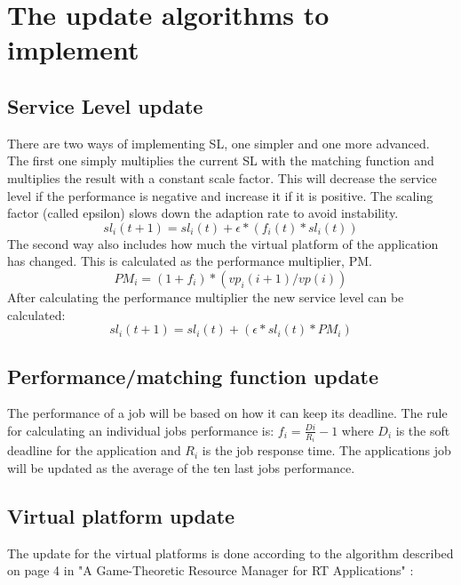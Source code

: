 \documentclass[nobiblatex]{LTHthesis}
\begin{document}
\section{The update algorithms to implement}


\subsection{Service Level update}
There are two ways of implementing SL, one simpler and one more advanced. The first one simply multiplies the current SL with the matching function and multiplies the result with a constant scale factor. This will decrease the service level if the performance is negative and increase it if it is positive. The scaling factor (called epsilon) slows down the adaption rate to avoid instability. 
\[sl_i(t+1)= sl_i(t) + \epsilon*(f_i(t)*sl_i(t)) \]
The second way also includes how much the virtual platform of the application has changed. This is calculated as the performance multiplier, PM.
\[PM_i = (1+f_i)*(vp_i(i+1)/vp(i))\]
After calculating the performance multiplier the new service level can be calculated:
\[sl_i(t+1)=sl_i(t) + (\epsilon*sl_i(t)*PM_i)\]

\subsection{Performance/matching function update}
The performance of a job will be based on how it can keep its deadline. The rule for calculating an individual jobs performance is:
$f_{i}=\frac{D{i}}{R_{i}}-1$ where $D_{i}$ is the soft deadline for the application and $R_{i}$ is the job response time.
The applications job will be updated as the average of the ten last jobs performance.

\subsection{Virtual platform update}

The update for the virtual platforms is done according to the algorithm described on page 4 in "A Game-Theoretic Resource Manager for RT Applications" \cite{gtrm}:
\end{document}
